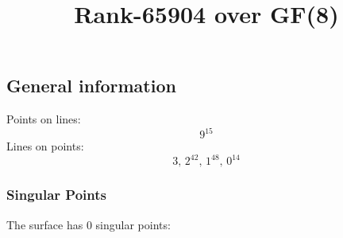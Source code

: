 \documentclass{article}
\newcommand\setTBstruts{\def\T{\rule{0pt}{2.6ex}}%
\def\B{\rule[-1.2ex]{0pt}{0pt}}}
\begin{document}
 
\setTBstruts



{\allowdisplaybreaks%






\title{Rank-65904 over GF(8)}
\author{}%
\maketitle%
%
{}



\subsection*{General information}
Points on lines:
$$
9^{15}$$
Lines on points:
$$
3,\,2^{42},\,1^{48},\,0^{14}$$
\subsubsection*{Singular Points}
The surface has 0 singular points:\\
\begin{align*}
\end{align*}
}
\end{document}
